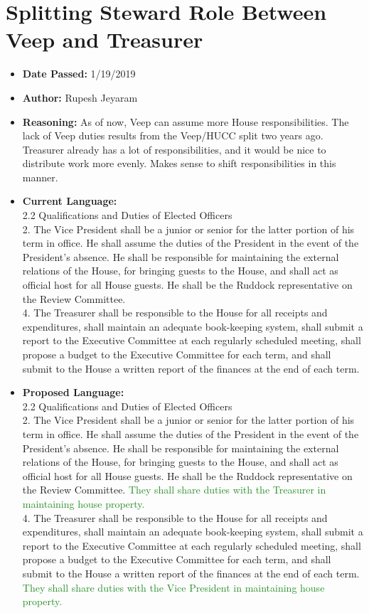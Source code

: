 \documentclass[10pt]{article} %
\begin{document}
\section{Splitting Steward Role Between Veep and Treasurer}
\begin{itemize}
	\item \textbf{Date Passed:} 1/19/2019
	\item \textbf{Author:} Rupesh Jeyaram
	\item \textbf{Reasoning:}  As of now, Veep can assume more House responsibilities. The lack of Veep duties results from the Veep/HUCC split two years ago. Treasurer already has a lot of responsibilities, and it would be nice to distribute work more evenly. Makes sense to shift responsibilities in this manner.
	\item \textbf{Current Language:} \\
	2.2 Qualifications and Duties of Elected Officers \\
	2. The Vice President shall be a junior or senior for the latter portion of his term in office. He shall assume the duties of the President in the event of the President’s absence. He shall be responsible for maintaining the external relations of the House, for bringing guests to the House, and shall act as official host for all House guests. He shall be the Ruddock representative on the Review Committee. \\
	4. The Treasurer shall be responsible to the House for all receipts and expenditures, shall maintain an adequate book-keeping system, shall submit a report to the Executive Committee at each regularly scheduled meeting, shall propose a budget to the Executive Committee for each term, and shall submit to the House a written report of the finances at the end of each term. 
	\item \textbf{Proposed Language:} \\
	2.2 Qualifications and Duties of Elected Officers \\
	2. The Vice President shall be a junior or senior for the latter portion of his term in office. He shall assume the duties of the President in the event of the President’s absence. He shall be responsible for maintaining the external relations of the House, for bringing guests to the House, and shall act as official host for all House guests. He shall be the Ruddock representative on the Review Committee. \textcolor{ForestGreen}{They shall share duties with the Treasurer in maintaining house property.} \\
	4. The Treasurer shall be responsible to the House for all receipts and expenditures, shall maintain an adequate book-keeping system, shall submit a report to the Executive Committee at each regularly scheduled meeting, shall propose a budget to the Executive Committee for each term, and shall submit to the House a written report of the finances at the end of each term. \textcolor{ForestGreen}{They shall share duties with the Vice President in maintaining house property.}
\end{itemize}
\end{document}
